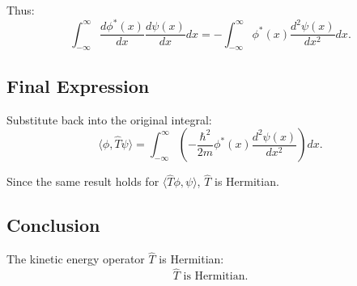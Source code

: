 \documentclass[a4paper,12pt]{article}
\begin{document}
Thus:
\[
\int_{-\infty}^\infty \frac{d\phi^*(x)}{dx} \frac{d\psi(x)}{dx} dx = -\int_{-\infty}^\infty \phi^*(x) \frac{d^2\psi(x)}{dx^2} dx.
\]

\subsection*{Final Expression}
Substitute back into the original integral:
\[
\langle \phi, \hat{T} \psi \rangle = \int_{-\infty}^\infty \left(-\frac{\hbar^2}{2m} \phi^*(x) \frac{d^2\psi(x)}{dx^2}\right) dx.
\]

Since the same result holds for $\langle \hat{T} \phi, \psi \rangle$, $\hat{T}$ is Hermitian.

\subsection*{Conclusion}
The kinetic energy operator $\hat{T}$ is Hermitian:
\[
\boxed{\hat{T} \text{ is Hermitian.}}
\]
\end{document}
